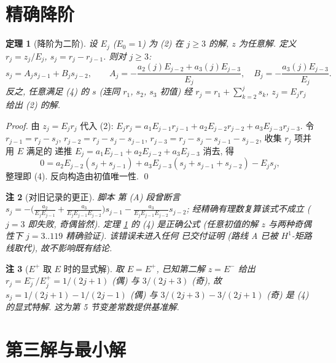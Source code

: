 \documentclass[UTF8]{ctexart}
\newtheorem{theorem}{定理}[section]
\newtheorem{remark}[theorem]{注}
\begin{document}
\section{精确降阶}

\begin{theorem}[降阶为二阶]\label{thm:reduction}
	设 $E_j$ ($E_0 = 1$) 为 (2) 在 $j \geq 3$ 的解, $z$ 为任意解. 定义
	$r_j = z_j/E_j$, $s_j = r_j - r_{j-1}$. 则对 $j \geq 3$:
	\begin{equation}
		s_j = A_j s_{j-1} + B_j s_{j-2},
		\qquad
		A_j = -\frac{a_2(j)E_{j-2} + a_3(j)E_{j-3}}{E_j},
		\quad B_j = -\frac{a_3(j)E_{j-3}}{E_j}.
	\end{equation}
	反之, 任意满足 (4) 的 $s$ (连同 $r_1$, $s_2$, $s_3$ 初值) 经
	$r_j = r_1 + \sum_{k=2}^j s_k$, $z_j = E_j r_j$ 给出 (2) 的解.
\end{theorem}

\begin{proof}
	由 $z_j = E_j r_j$ 代入 (2):
	$E_j r_j = a_1 E_{j-1} r_{j-1} + a_2 E_{j-2} r_{j-2} + a_3 E_{j-3} r_{j-3}$.
	令 $r_{j-1} = r_j - s_j$, $r_{j-2} = r_j - s_j - s_{j-1}$,
	$r_{j-3} = r_j - s_j - s_{j-1} - s_{j-2}$, 收集 $r_j$ 项并用 $E$ 满足的
	递推 $E_j = a_1 E_{j-1} + a_2 E_{j-2} + a_3 E_{j-3}$ 消去, 得
	\[
		0 = a_2 E_{j-2}(s_j + s_{j-1}) + a_3 E_{j-3}(s_j + s_{j-1} + s_{j-2}) - E_j s_j,
	\]
	整理即 (4). 反向构造由初值唯一性. \qed
\end{proof}

\begin{remark}[对旧记录的更正]
	脚本  第 (A) 段曾断言
	$s_j = -\bigl(\frac{a_2}{E_j E_{j-1}} + \frac{a_3}{E_j E_{j-1} E_{j-2}}\bigr)s_{j-1}
	- \frac{a_3}{E_j E_{j-1} E_{j-2}} s_{j-2}$; 经精确有理数复算该式不成立
	($j = 3$ 即失败, 奇偶皆然). 定理 \ref{thm:reduction} 的 (4) 是正确公式
	(任意初值的解 $z$ 与两种奇偶性下 $j = 3..119$ 精确验证). 该错误未进入任何
	已交付证明 (路线 A 已被 $H^1$-矩路线取代), 故不影响既有结论.
\end{remark}

\begin{remark}[$E^+$ 取 $E$ 时的显式解]
	取 $E = E^+$, 已知第二解 $z = E^-$ 给出
	$r_j = E^-_j/E^+_j = 1/(2j+1)$ (偶) 与 $3/(2j+3)$ (奇),
	故 $s_j = 1/(2j+1) - 1/(2j-1)$ (偶) 与 $3/(2j+3) - 3/(2j+1)$ (奇)
	是 (4) 的显式特解. 这为第 5 节变差常数提供基准解.
\end{remark}

\section{第三解与最小解}
\end{document}
